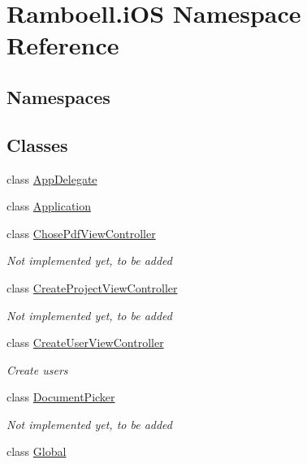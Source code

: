\hypertarget{namespace_ramboell_1_1i_o_s}{}\section{Ramboell.\+i\+OS Namespace Reference}
\label{namespace_ramboell_1_1i_o_s}
\subsection*{Namespaces}
\begin{DoxyCompactItemize}
\end{DoxyCompactItemize}
\subsection*{Classes}
\begin{DoxyCompactItemize}
\item 
class \hyperlink{class_ramboell_1_1i_o_s_1_1_app_delegate}{App\+Delegate}
\item 
class \hyperlink{class_ramboell_1_1i_o_s_1_1_application}{Application}
\item 
class \hyperlink{class_ramboell_1_1i_o_s_1_1_chose_pdf_view_controller}{Chose\+Pdf\+View\+Controller}
\begin{DoxyCompactList}\small\item\em Not implemented yet, to be added \end{DoxyCompactList}\item 
class \hyperlink{class_ramboell_1_1i_o_s_1_1_create_project_view_controller}{Create\+Project\+View\+Controller}
\begin{DoxyCompactList}\small\item\em Not implemented yet, to be added \end{DoxyCompactList}\item 
class \hyperlink{class_ramboell_1_1i_o_s_1_1_create_user_view_controller}{Create\+User\+View\+Controller}
\begin{DoxyCompactList}\small\item\em Create users \end{DoxyCompactList}\item 
class \hyperlink{class_ramboell_1_1i_o_s_1_1_document_picker}{Document\+Picker}
\begin{DoxyCompactList}\small\item\em Not implemented yet, to be added \end{DoxyCompactList}\item 
class \hyperlink{class_ramboell_1_1i_o_s_1_1_global}{Global}

\end{DoxyCompactItemize}
